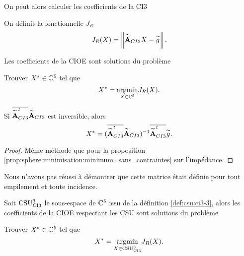     On peut alors calculer les coefficients de la CI3

    \begin{defn}
      On définit la fonctionnelle \(J_R\)
      \begin{equation*}
        J_R(X) = \norm{\tilde{\mA}_{CI3}X - \tilde{g}}.
      \end{equation*}
    \end{defn}

    \begin{defn}

      Les coefficients de la CIOE sont solutions du problème

      Trouver \(X^* \in \CC^5\) tel que
      \begin{equation*}
        X^* = \argmin{X\in \CC^5} J_R(X).
      \end{equation*}
    \end{defn}

    \begin{prop}
      Si \(\conj{\tilde{\mA}_{CI3}^t}\tilde{\mA}_{CI3}\) est inversible, alors
      \begin{equation*}
        X^* = (\conj{\tilde{\mA}_{CI3}^t}\tilde{\mA}_{CI3})^{-1}\conj{\tilde{\mA}_{CI3}^t}\tilde{g}.
      \end{equation*}
    \end{prop}
    \begin{proof}
      Même méthode que pour la proposition \ref{prop:sphere:minimisation:minimum_sans_contraintes} sur l'impédance.
    \end{proof}

    Nous n'avons pas réussi à démontrer que cette matrice était définie pour tout empilement et toute incidence.

    \begin{defn}

      Soit \(\CSU[3]{CI3}\) le sous-espace de \(\CC^5\) issu de la définition \ref{def:csu:ci3-3}, alors les coefficients de la CIOE respectant les CSU sont solutions du problème

      Trouver \(X^* \in \CC^5\) tel que
      \begin{equation*}
        X^* = \argmin{X\in \CSU[3]{CI3}} J_R(X).
      \end{equation*}
    \end{defn}
